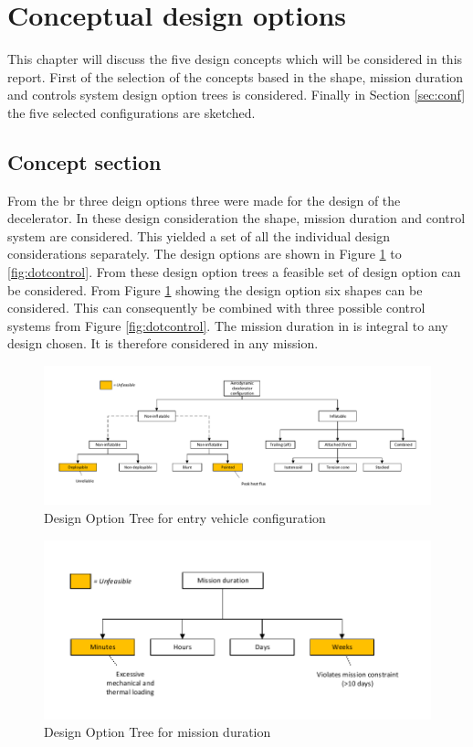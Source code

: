 \section{Conceptual design options} \label{ch:options}
This chapter will discuss the five design concepts which will be considered in this report. First of the selection of the concepts based in the shape, mission duration and controls system design option trees is considered. Finally in Section \ref{sec:conf} the five selected configurations are sketched. 

\subsection{Concept section}
 From the \acrfull{br} three deign options three were made for the design of the decelerator. In these design consideration the shape, mission duration and control system are considered. This yielded a set of all the individual design considerations separately. The design options are shown in Figure \ref{fig:dotshape} to \ref{fig:dotcontrol}. From these design option trees a feasible set of design option can be considered. From Figure \ref{fig:dotshape} showing the design option six shapes can be considered. This can consequently be combined with three possible control systems from Figure \ref{fig:dotcontrol}. The mission duration in is integral to any design chosen. It is therefore considered in any mission. 

\begin{figure}[H]
\hspace{-23mm}
\includegraphics[width = 1.25\textwidth]{Figure/DOT_configuration.pdf}
\vspace{-5mm}
\caption{Design Option Tree for entry vehicle configuration}
\label{fig:dotshape}
\end{figure}

\begin{figure}[H]
\centering
\includegraphics[width = 1.0\textwidth]{Figure/DOT_missionduration.pdf}
\vspace{-5mm}
\caption{Design Option Tree for mission duration}
\label{fig:dotduration}
\end{figure}


